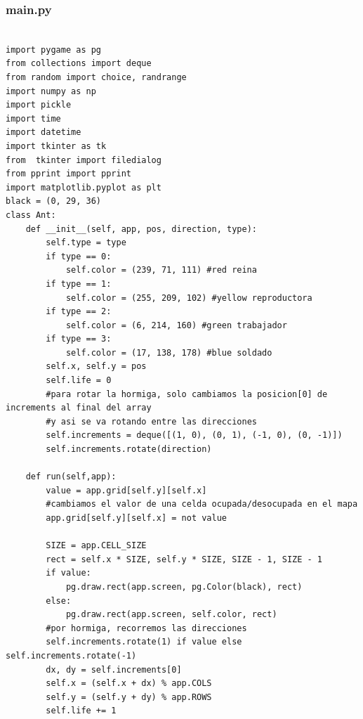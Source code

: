 \documentclass[10pt]{article}
\begin{document}
            \subsubsection{main.py}
            \lstset{language=Python}
                \begin{verbatim}

import pygame as pg
from collections import deque
from random import choice, randrange
import numpy as np
import pickle
import time
import datetime
import tkinter as tk
from  tkinter import filedialog
from pprint import pprint
import matplotlib.pyplot as plt
black = (0, 29, 36)
class Ant:
    def __init__(self, app, pos, direction, type):
        self.type = type
        if type == 0:
            self.color = (239, 71, 111) #red reina
        if type == 1:
            self.color = (255, 209, 102) #yellow reproductora
        if type == 2:
            self.color = (6, 214, 160) #green trabajador
        if type == 3:
            self.color = (17, 138, 178) #blue soldado
        self.x, self.y = pos
        self.life = 0
        #para rotar la hormiga, solo cambiamos la posicion[0] de increments al final del array
        #y asi se va rotando entre las direcciones
        self.increments = deque([(1, 0), (0, 1), (-1, 0), (0, -1)])
        self.increments.rotate(direction)

    def run(self,app):
        value = app.grid[self.y][self.x]
        #cambiamos el valor de una celda ocupada/desocupada en el mapa
        app.grid[self.y][self.x] = not value

        SIZE = app.CELL_SIZE
        rect = self.x * SIZE, self.y * SIZE, SIZE - 1, SIZE - 1
        if value:
            pg.draw.rect(app.screen, pg.Color(black), rect)
        else:
            pg.draw.rect(app.screen, self.color, rect)
        #por hormiga, recorremos las direcciones
        self.increments.rotate(1) if value else self.increments.rotate(-1)
        dx, dy = self.increments[0]
        self.x = (self.x + dx) % app.COLS
        self.y = (self.y + dy) % app.ROWS
        self.life += 1



\end{verbatim}
\end{document}
